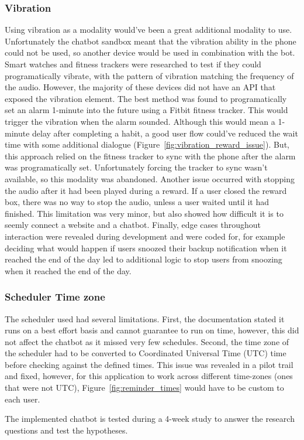\subsubsection*{Vibration}
Using vibration as a modality would've been a great additional modality to use.
Unfortunately the chatbot sandbox meant that the vibration ability in the phone could not be used, so another device would be used in combination with the bot.
Smart watches and fitness trackers were researched to test if they could programatically vibrate, with the pattern of vibration matching the frequency of the audio.
However, the majority of these devices did not have an API that exposed the vibration element. The best method was found to programatically set an alarm 1-minute into the future using a Fitbit fitness tracker.
This would trigger the vibration when the alarm sounded.
Although this would mean a 1-minute delay after completing a habit, a good user flow could've reduced the wait time with some additional dialogue (Figure~\ref{fig:vibration_reward_issue}).
But, this approach relied on the fitness tracker to sync with the phone after the alarm was programatically set. Unfortunately forcing the tracker to sync wasn't available, so this modality was abandoned. Another issue occurred with stopping the audio after it had been played during a reward. If a user closed the reward box, there was no way to stop the audio, unless a user waited until it had finished. This limitation was very minor, but also showed how difficult it is to seemly connect a website and a chatbot. Finally, edge cases throughout interaction were revealed during development and were coded for, for example deciding what would happen if users snoozed their backup notification when it reached the end of the day led to additional logic to stop users from snoozing when it reached the end of the day.

\subsubsection*{Scheduler Time zone}
The scheduler used had several limitations. First, the documentation stated it runs on a best effort basis and cannot guarantee to run on time, however, this did not affect the chatbot as it missed very few schedules. Second, the time zone of the scheduler had to be converted to Coordinated Universal Time (UTC) time before checking against the defined times. This issue was revealed in a pilot trail and fixed, however, for this application to work across different time-zones (ones that were not UTC), Figure~\ref{fig:reminder_times} would have to be custom to each user.

The implemented chatbot is tested during a 4-week study to answer the research questions and test the hypotheses.
\newpage
